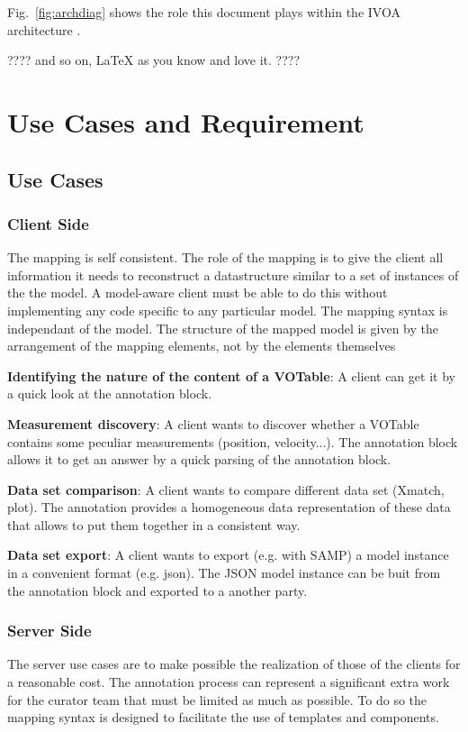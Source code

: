 \documentclass[11pt,a4paper]{ivoa}
\begin{document}
Fig.~\ref{fig:archdiag} shows the role this document plays within the
IVOA architecture \citep{note:VOARCH}.

???? and so on, LaTeX as you know and love it. ????

\section{Use Cases and Requirement}

\subsection{Use Cases}

\subsubsection{Client Side}

The mapping is self consistent. The role of the mapping is to give the client all information it needs to reconstruct a datastructure similar to a set of instances of the the model. 
A model-aware client must be able to do this without implementing any code specific to any particular model.  The mapping syntax is independant of the model. The structure of the mapped model is given by the arrangement of the mapping elements, not by the elements themselves

\textbf{Identifying the nature of the content of a VOTable}: A client can get it by a quick look at the annotation block.

\textbf{Measurement discovery}: A client wants to discover whether a VOTable contains some peculiar measurements (position, velocity...). The annotation block allows it to get an answer by a quick parsing of the annotation block.

\textbf{Data set comparison}: A client wants to compare different data set (Xmatch, plot). The annotation provides a homogeneous data representation of these data that allows to put them together in a consistent way. 

\textbf{Data set export}: A client wants to export (e.g. with SAMP) a model instance in a convenient format (e.g. json). The JSON model instance can be buit from the annotation block and exported to a another party.

\subsubsection{Server Side}
The server use cases are to make possible the realization of those of the clients  for a reasonable cost. The annotation process can represent a significant extra work for the curator team that must be limited as much as possible. To do so the mapping syntax is designed to facilitate the use of templates and components.
\end{document}
